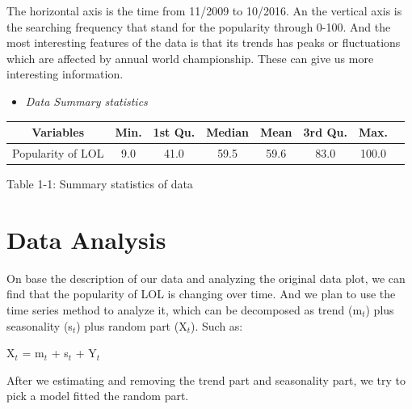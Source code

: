 \documentclass[11pt,a4paper]{article}
\begin{document}
The horizontal axis is the time from 11/2009 to 10/2016. An the vertical axis is the searching frequency that stand for the popularity through 0-100. And the most interesting features of the data is that its trends has peaks or fluctuations which are affected by annual world championship. These can give us more interesting information.
\begin{itemize}\item
\textit{Data Summary statistics}
\end{itemize}
\vspace{10 mm}
\begin{center}
\begin{table}[htbp]
\begin{center}
\begin{tabular}{l  c  c  c  c  c  c  c }\hline\hline
\multicolumn{1}{c}{Variables} &     Min. &          1st Qu.&         Median&         Mean&  3rd Qu.&Max.\\ \hline
Popularity of LOL&9.0&41.0&59.5&59.6&83.0&100.0\\
\hline \hline
 \end{tabular}
 
 {Table 1-1: Summary statistics of data}
 \end{center}
\end{table}

\end{center}

\section*{Data Analysis}

On base the description of our data and analyzing the original data plot, we can find that the popularity of LOL is changing over time. And we plan to use the time series method to analyze it, which can be decomposed as trend (m$_t$) plus seasonality (s$_t$) plus random part (X$_t$). Such as:

\begin{center}
X$_t$ = m$_t$ + s$_t$ + Y$_t$
\end{center} 

After we estimating and removing the trend part and seasonality part, we try to pick a model fitted the random part.
\end{document}
